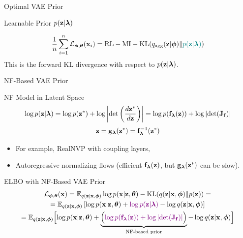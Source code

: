 \documentclass{beamer}
\begin{document}
\begin{frame}{Optimal VAE Prior}
\begin{minipage}[t]{0.5\columnwidth}
\begin{block}{Learnable Prior $p(\mathbf{z} | \boldsymbol{\lambda})$}
\begin{figure}[h]
			\end{figure}
		\end{block}
	\end{minipage}
	\vspace{-0.3cm}
	\[
	\frac{1}{n}\sum_{i=1}^n \mathcal{L}_{\boldsymbol{\phi}, \boldsymbol{\theta}}(\mathbf{x}_i) = \text{RL} - \text{MI} -  \mathrm{KL}(q_{\text{agg}}(\mathbf{z} | \boldsymbol{\phi}) \| {\color{teal}p(\mathbf{z} | \boldsymbol{\lambda})})
	\]
	This is the forward KL divergence with respect to $p(\mathbf{z} | \boldsymbol{\lambda})$.
\end{frame}
\begin{frame}{NF-Based VAE Prior}
	\begin{block}{NF Model in Latent Space}
		\vspace{-0.5cm}
		\[
		\log p(\mathbf{z} | \boldsymbol{\lambda}) = \log p(\mathbf{z}^*) + \log  \left | \det \left(\frac{d \mathbf{z}^*}{d\mathbf{z}}\right)\right| = \log p(\mathbf{f}_{\boldsymbol{\lambda}}(\mathbf{z})) + \log \left | \det (\mathbf{J}_{\mathbf{f}})\right| 
		\]
		\vspace{-0.3cm}
		\[
		\mathbf{z} = \mathbf{g}_{\boldsymbol{\lambda}}(\mathbf{z}^*) = \mathbf{f}^{-1}_{\boldsymbol{\lambda}}(\mathbf{z}^*)
		\]
	\end{block}
	\vspace{-0.3cm}
	\begin{itemize}
		\item For example, RealNVP with coupling layers,
		\item Autoregressive normalizing flows (efficient $\mathbf{f}_{\boldsymbol{\lambda}}(\mathbf{z})$, but $\mathbf{g}_{\boldsymbol{\lambda}}(\mathbf{z}^*)$ can be slow).
	\end{itemize}
	\begin{block}{ELBO with NF-Based VAE Prior}
		\vspace{-0.5cm}
		{\small
			\begin{multline*}
				\mathcal{L}_{\boldsymbol{\phi}, \boldsymbol{\theta}}(\mathbf{x}) = \mathbb{E}_{q(\mathbf{z} | \mathbf{x}, \boldsymbol{\phi})} \log p(\mathbf{x} | \mathbf{z} , \boldsymbol{\theta}) - \mathrm{KL}(q(\mathbf{z}| \mathbf{x}, \boldsymbol{\phi}) \| p(\mathbf{z})) = \\ 
				= \mathbb{E}_{q(\mathbf{z} | \mathbf{x}, \boldsymbol{\phi})} \left[ \log p(\mathbf{x} | \mathbf{z}, \boldsymbol{\theta}) + {\color{violet}\log p(\mathbf{z} | \boldsymbol{\lambda})} - \log q(\mathbf{z} | \mathbf{x}, \boldsymbol{\phi}) \right] \\
				= \mathbb{E}_{q(\mathbf{z} | \mathbf{x}, \boldsymbol{\phi})} \Bigl[ \log p(\mathbf{x} | \mathbf{z}, \boldsymbol{\theta}) + \underbrace{ \Bigl({\color{violet} \log p(\mathbf{f}_{\boldsymbol{\lambda}}(\mathbf{z})) + \log \left| \det (\mathbf{J}_{\mathbf{f}}) \right|} \Bigr) }_{\text{NF-based prior}} - \log q(\mathbf{z} | \mathbf{x}, \boldsymbol{\phi}) \Bigr] 
			\end{multline*}
		}
	\end{block}
\end{frame}
\end{document}
